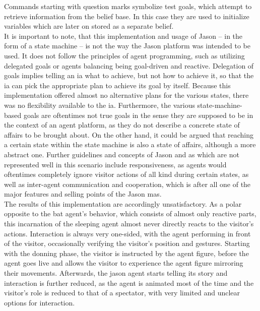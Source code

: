 \documentclass[draft,final]{vutinfth} %
\begin{document}
Commands starting with question marks symbolize test goals, which attempt to retrieve information from the belief base. 
In this case they are used to initialize variables which are later on stored as a separate belief. \\
It is important to note, that this implementation and usage of Jason – in the form of a state machine – is not the way the Jason platform was intended to be used. 
It does not follow the principles of agent programming, such as utilizing delegated goals or agents balancing being goal-driven and reactive. 
Delegation of goals implies telling an \gls{ia} what to achieve, but not how to achieve it, so that the \gls{ia} can pick the appropriate plan to achieve its goal by itself. 
Because this implementation offered almost no alternative plans for the various states, there was no flexibility available to the \gls{ia}. 
Furthermore, the various state-machine-based goals are oftentimes not true goals in the sense they are supposed to be in the context of an agent platform, as they do not describe a concrete state of affairs to be brought about. 
On the other hand, it could be argued that reaching a certain state within the state machine is also a state of affairs, although a more abstract one. 
Further guidelines and concepts of Jason and \gls{as} which are not represented well in this scenario include responsiveness, as agents would oftentimes completely ignore \gls{visitor} actions of all kind during certain states, as well as inter-agent communication and cooperation, which is after all one of the major features and selling points of the Jason \gls{mas}. \\
The results of this implementation are accordingly unsatisfactory. 
As a polar opposite to the bat agent’s behavior, which consists of almost only reactive parts, this incarnation of the sleeping agent almost never directly reacts to the \gls{visitor}’s actions. 
Interaction is always very one-sided, with the agent performing in front of the \gls{visitor}, occasionally verifying the \gls{visitor}’s position and gestures. 
Starting with the donning phase, the \gls{visitor} is instructed by the \gls{agent figure}, before the agent goes \gls{live} and allows the \gls{visitor} to experience the \gls{agent figure} mirroring their movements. 
Afterwards, the \gls{jason agent} starts telling its story and interaction is further reduced, as the agent is animated most of the time and the \gls{visitor}’s role is reduced to that of a spectator, with very limited and unclear options for interaction. \\
\end{document}

